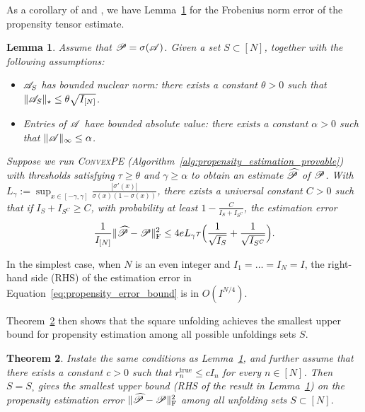 \documentclass{article}
\newcommand{\T}[2][]{#1\mathscr{\MakeUppercase{#2}}}
\newcommand{\norm}[1]{\Vert #1 \Vert}
\newcommand{\fnorm}[1]{\norm{#1}_{\mathrm{F}}}
\newcommand{\nucnorm}[1]{\norm{#1}_\star}
\newcommand{\maxnorm}[1]{\norm{#1}_{\infty}}
\def\Ph{\widehat P}
\theoremstyle{plain}
\newtheorem{theorem}{Theorem}
\newtheorem{lemma}[theorem]{Lemma}
\begin{document}
As a corollary of \cite[Lemma 1]{davenport20141} and \cite[Theorem 2]{ma2019missing}, we have Lemma~\ref{lem:propensity_error} for the Frobenius norm error of the propensity tensor estimate.
\begin{lemma}
	\label{lem:propensity_error}
	Assume that $\T{P} = \sigma (\T{A})$.
	Given a set $S \subset [N]$, together with the following assumptions:
	\begin{itemize}[leftmargin=2em,topsep=0pt,partopsep=1ex,parsep=0ex]
		\item[\textbf{A1.}] $\T{A}_S$ has bounded nuclear norm: there exists a constant
		$\theta > 0 $ such that $\nucnorm{\T{A}_S} \leq \theta \sqrt{I_{[N]}}$.
		\item[\textbf{A2.}] Entries of $\T{A}$ have bounded absolute value: there exists a constant $\alpha>0$ such that $\maxnorm{\T{A}} \leq \alpha$.
	\end{itemize}
	Suppose we run \textsc{ConvexPE} (Algorithm~\ref{alg:propensity_estimation_provable}) with thresholds satisfying $\tau \geq \theta$ and $\gamma \geq \alpha$ to obtain an estimate $\T{\Ph}$ of $\T{P}$.
	With $L_\gamma := \sup_{x\in[-\gamma,\gamma]} \frac{|\sigma'(x)|}{\sigma(x)(1-\sigma(x))}$, there exists a universal constant $C > 0$ such that if $I_S + I_{S^C} \geq C$, with probability at least $1 - \frac{C}{I_S + I_{S^C}}$, the estimation error
	\begin{equation}
		\label{eq:propensity_error_bound}
		\frac{1}{I_{[N]}} \fnorm{\widehat{\T{P}} - \T{P}}^2
		\leq 4 e L_\gamma \tau \Big(\frac{1}{\sqrt{I_S}}+\frac{1}{\sqrt{I_{S^C}}}\Big).
	\end{equation}
\end{lemma}

In the simplest case, when $N$ is an even integer and $I_1 = \ldots = I_N = I$, the right-hand side (RHS) of the estimation error in Equation~\ref{eq:propensity_error_bound} is in $O(I^{N/4})$.

Theorem~\ref{thm:square_unfolding_for_general_matrices} then shows that the square unfolding achieves the smallest upper bound for propensity estimation among all possible unfoldings sets $S$.
\begin{theorem}
	\label{thm:square_unfolding_for_general_matrices}
	Instate the same conditions as Lemma~\ref{lem:propensity_error},
	and further assume that there exists a constant $c>0$ such that $r_n^\mathrm{true} \leq c I_n$ for every $n \in [N]$.
	Then $S = S_\square$ gives the smallest upper bound (RHS of the result in Lemma~\ref{lem:propensity_error}) on the propensity estimation error $\fnorm{\widehat{\T{P}} - \T{P}}^2$ among all unfolding sets $S \subset [N]$.
\end{theorem}
\end{document}
